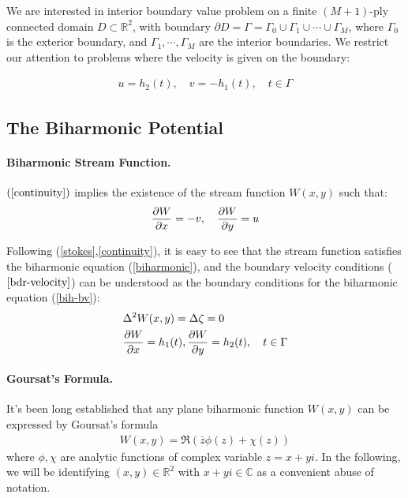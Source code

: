 \documentclass[10pt,twocolumn]{article}
\newtheorem[L]{thm}{Theorem}[section]
\begin{document}
We are interested in interior boundary value problem on a finite $(M+1)$-ply connected domain $D\subset \mathbb R^2$,
with boundary $\partial D =  \Gamma = \Gamma_0 \cup \Gamma_1 \cup \cdots \cup \Gamma_M$, 
where $\Gamma_0$ is the exterior boundary, and $\Gamma_1,\cdots, \Gamma_M$ are the interior boundaries. We restrict our attention to 
problems where the velocity is given on the boundary:

\begin{align}
  u = h_2(t),\quad v = - h_1(t), \quad t\in \Gamma
  \label{bdr-velocity}
\end{align}

\subsection{The Biharmonic Potential}

\paragraph*{Biharmonic Stream Function.} $(\ref{continuity})$ implies the existence of the stream function $W(x,y)$ such that:
\begin{align}
  \pdv{W}{x} = -v,\quad \pdv{W}{y} = u \label{stream-1}
\end{align}

Following (\ref{stokes},\ref{continuity}), it is easy to see that the stream function satisfies the biharmonic equation (\ref{biharmonic}),
and the boundary velocity conditions ($\ref{bdr-velocity}$) can be understood as the boundary conditions for the biharmonic equation (\ref{bih-bv}):
\begin{align}
  &\Delta^2 W(x,y) = \Delta \zeta = 0 \label{biharmonic}\\
  &\pdv{W}{x}(t) = h_1(t), \pdv{W}{y}(t) = h_2(t), \quad t\in \Gamma\label{bih-bv}
\end{align}

\paragraph*{Goursat's Formula.} It's been long established that any plane biharmonic function $W(x,y)$ can be expressed by Goursat's formula 
\begin{align}
  W(x,y) = \Re (\bar z \phi(z) + \chi (z)) \label{Goursat}
\end{align}
where $\phi, \chi$ are analytic functions of complex variable $z = x+yi$. In the following, we will be identifying $(x,y) \in \mathbb{R}^2$ with $x + yi\in \mathbb{C}$
as a convenient abuse of notation. 
\end{document}
